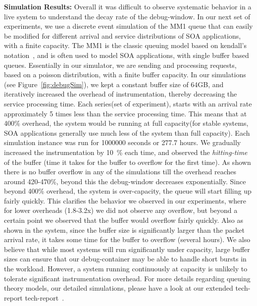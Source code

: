 \noindent
\textbf{Simulation Results:} 
Overall it was difficult to observe systematic behavior in a live system to understand the decay rate of the debug-window. 
In our next set of experiments, we use a discrete event simulation of the M\/M\/1 queue that can easily be modified for different arrival and service distributions of SOA applications, with a finite capacity.
The M\/M\/1 is the classic queuing model based on kendall's notation~\cite{kendall1953}, and is often used to model SOA applications, with single buffer based queues.
Essentially in our simulator, we are sending and processing requests, based on a poisson distribution, with a finite buffer capacity.
In our simulations (see Figure~\ref{fig:debugSim}), we kept a constant buffer size of 64GB, and iteratively increased the overhead of instrumentation, thereby decreasing the service processing time.
Each series(set of experiment), starts with an arrival rate approximately 5 times less than the service processing time. 
This means that at 400\% overhead, the system would be running at full capacity(for stable systems,  SOA applications generally use much less of the system than full capacity).
Each simulation instance was run for 1000000 seconds or 277.7 hours.
We gradually increased the instrumentation by 10~\% each time, and observed the \textit{hitting-time} of the buffer (time it takes for the buffer to overflow for the first time).
As shown there is no buffer overflow in any of the simulations till the overhead reaches around 420-470\%, beyond this the debug-window decreases exponentially.
Since beyond 400\% overhead, the system is over-capacity, the queue will start filling up fairly quickly. 
This clarifies the behavior we observed in our experiments, where for lower overheads (1.8-3.2x) we did not observe any overflow, but beyond a certain point we observed that the buffer would overflow fairly quickly.
Also as shown in the system, since the buffer size is significantly larger than the packet arrival rate, it takes some time for the buffer to overflow (several hours).
We also believe that while most systems will run significantly under capacity, large buffer sizes can ensure that our debug-container may be able to handle short bursts in the workload.
However,  a system running continuously at capacity is unlikely to tolerate significant instrumentation overhead.
For more details regarding queuing theory models, our detailed simulations, please have a look at our extended tech-report tech-report~\cite{parikshanQueue}.

